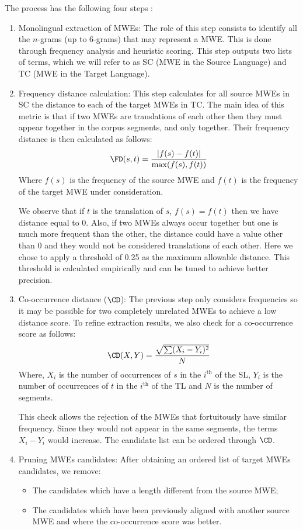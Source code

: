 \documentclass[output=paper,modfonts,nonflat]{langsci/langscibook}
\begin{document}
The  process has the following four steps \citep{semmar2010hybrid}:
\begin{enumerate}
 \item Monolingual extraction of MWEs: The role of this step consists to identify all the $n$-grams (up to 6-grams) that may represent a MWE. This is done through frequency analysis and heuristic scoring. This step outputs two lists of terms, which we will refer to as SC (MWE in the Source Language) and TC (MWE in the Target Language).
 \item Frequency distance calculation: This step calculates for all source MWEs in SC the distance to each of the target MWEs in TC. The main idea of this metric is that if two MWEs are translations of each other then they must appear together in the corpus segments, and only together. Their frequency distance is then calculated as follows:
 \begin{equation}
  \FD(s,t)=\frac{|f(s)-f(t)|}{\max(f(s),f(t))}
 \end{equation}
 Where $f(s)$ is the frequency of the source MWE and $f(t)$ is the frequency of the target MWE under consideration.

We observe that if $t$ is the translation of $s$, $f(s) = f(t) $ then we have distance equal to 0. 
Also, if two MWEs always occur together but one is much more frequent than the other, the distance could have a value other than 0 and they would not be considered translations of each other. 
Here we chose to apply a threshold of 0.25 as the maximum allowable distance. This threshold is calculated empirically and can be tuned to achieve better precision.

\item Co-occurrence distance ($\CD$): The previous step only considers frequencies so it may be possible for two completely unrelated MWEs to achieve a low distance score. To refine extraction results, we also check for a co-occurrence score as follows:
\begin{equation}
  \CD(X,Y)=\frac{\sqrt{\sum(X_i-Y_i)^2}}{N}
\end{equation}
Where, $X_i$ is the number of occurrences of $s$ in the $i^{\text{th}}$  of the SL, $Y_i$ is the number of occurrences of $t$ in the $i^{\text{th}}$  of the TL and $N$ is the number of segments.

This check allows the rejection of the MWEs that fortuitously have similar frequency. Since they would not appear in the same segments, the terms $X_i-Y_i$ would increase. The candidate list can be ordered through $\CD$.

\item Pruning MWEs candidates: After obtaining an ordered list of target MWEs candidates, we remove:
\begin{itemize}
 \item The candidates which have a length different from the source MWE;
 \item The candidates which have been previously aligned with another source MWE and where the co-occurrence score was better.
\end{itemize}
\end{enumerate}
\end{document}
